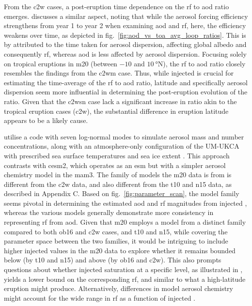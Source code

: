 \documentclass{ametsocV6.1}
\newcommand{\iso}[1][i]{{#1}njected \ce{SO2}}
\begin{document}
From the \gls{c2w} cases, a post-eruption time dependence on the \gls{rf} to \gls{aod}
ratio emerges. \citet{marshall2020} discusses a similar aspect, noting that while the
aerosol forcing efficiency strengthens from year 1 to year 2 when examining \gls{aod}
and \gls{rf}, here, the efficiency weakens over time, as depicted in
fig.~\ref{fig:aod_vs_toa_avg_loop_ratios}. This is by \citet{marshall2020} attributed to
the time taken for aerosol dispersion, affecting global albedo and consequently
\gls{rf}, whereas \gls{aod} is less affected by aerosol dispersion. Focusing solely on
tropical eruptions in \gls{m20} (between \(-10\) and \(\SI{10}{\degree\mathrm{N}}\)),
the \gls{rf} to \gls{aod} ratio closely resembles the findings from the \gls{c2wm} case.
Thus, while \iso{} is crucial for estimating the time-average of the \gls{rf} to
\gls{aod} ratio, latitude and specifically aerosol dispersion seem more influential in
determining the post-eruption evolution of the ratio. Given that the \gls{c2wsn} case
lack a significant increase in ratio akin to the tropical eruption cases (\gls{c2w}),
the substantial difference in eruption latitude appears to be a likely cause.

\citet{marshall2019, marshall2020, marshall2021} utilise a code with seven log-normal
modes to simulate aerosol mass and number concentrations, along with an atmosphere-only
configuration of the UM-UKCA with prescribed sea surface temperatures and sea ice extent
\citep{marshall2019}. This approach contrasts with \gls{cesm2}, which operates as an
\gls{esm} but with a simpler aerosol chemistry model in the \gls{mam3}. The family of
models the \gls{m20} data is from is different from the \gls{c2w} data, and also
different from the \gls{t10} and \gls{n15} data, as described in Appendix C. Based on
fig.~\ref{fig:parameter_scan}, the model family seems pivotal in determining the
estimated \gls{aod} and \gls{rf} magnitudes from \iso{}, whereas the various models
generally demonstrate more consistency in representing \gls{rf} from \gls{aod}. Given
that \gls{m20} employs a model from a distinct family compared to both \gls{ob16} and
\gls{c2w} cases, and \gls{t10} and \gls{n15}, while covering the parameter space between
the two families, it would be intriguing to include higher \iso{} values in the
\gls{m20} data to explore whether it remains bounded below (by \gls{t10} and \gls{n15})
and above (by \gls{ob16} and \gls{c2w}). This also prompts questions about whether
\iso{} saturation at a specific level, as illustrated in \citet{niemeier2015}, yields a
lower bound on the corresponding \gls{rf}, and similar to what a high-latitude eruption
might produce. Alternatively, differences in model aerosol chemistry might account for
the wide range in \gls{rf} as a function of \iso{}.
\end{document}
